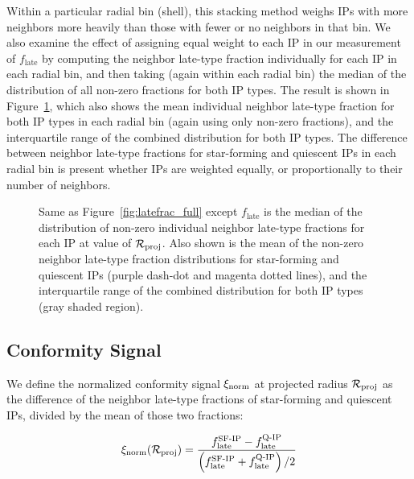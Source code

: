 Within a particular radial bin (shell), this stacking method weighs IPs with more neighbors more heavily than those with fewer or no neighbors in that bin.
We also examine the effect of assigning equal weight to each IP in our measurement of $f_{\textrm{late}}$ by computing the neighbor late-type fraction individually for each IP in each radial bin, and then taking (again within each radial bin) the median of the distribution of all non-zero fractions for both IP types.
The result is shown in Figure~\ref{fig:latefrac_quartiles}, which also shows the mean individual neighbor late-type fraction for both IP types in each radial bin (again using only non-zero fractions),
and the interquartile range of the combined distribution for both IP types.
The difference between neighbor late-type fractions for star-forming and quiescent IPs in each radial bin is present whether IPs are weighted equally, or proportionally to their number of neighbors.

\begin{figure}
  \epstrim{0.5in 0.1in 0.3in 0.3in}
  \caption{Same as Figure~\ref{fig:latefrac_full} except $f_{\textrm{late}}$ is the median of the distribution of non-zero individual neighbor late-type fractions for each IP at value of $\mathcal{R}_{\text{proj}}$.
Also shown is the mean of the non-zero neighbor late-type fraction distributions for star-forming and quiescent IPs (purple dash-dot and magenta dotted lines),
and the interquartile range of the combined distribution for both IP types (gray shaded region).
}
  \label{fig:latefrac_quartiles}
\end{figure}

\subsection{Conformity Signal}\label{sec:signal}

We define the normalized conformity signal $\xi_{\textrm{norm}}$ at projected radius $\mathcal{R}_{\text{proj}}$ as the difference of the neighbor late-type fractions of star-forming and quiescent IPs, 
divided by the mean of those two fractions:

\begin{equation}
	\signorm(\Rproj) = \frac
	{ f^{\textrm{SF-IP}}_{\textrm{late}}-f^{\textrm{Q-IP}}_{\textrm{late}} }
	{ \left( f^{\textrm{SF-IP}}_{\textrm{late}}+f^{\textrm{Q-IP}}_{\textrm{late}} \right) /2}
\end{equation}

